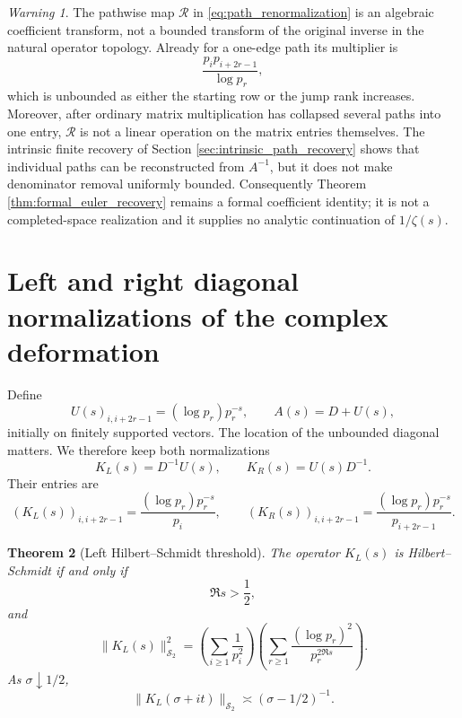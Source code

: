 \documentclass[11pt]{amsart}
\numberwithin{equation}{section}
\theoremstyle{plain}
\newtheorem{theorem}{Theorem}[section]
\theoremstyle{definition}
\theoremstyle{remark}
\newtheorem{warning}[theorem]{Warning}
\newcommand{\HS}{\mathcal S_2}
\begin{document}
\begin{warning}
\label{warn:renormalization_unbounded}
The pathwise map $\mathcal R$ in \eqref{eq:path_renormalization} is an algebraic coefficient transform, not a bounded transform of the original inverse in the natural operator topology.  Already for a one-edge path its multiplier is
\begin{equation}
\frac{p_i p_{i+2r-1}}{\log p_r},
\label{eq:one_edge_renormalization_multiplier}
\end{equation}
which is unbounded as either the starting row or the jump rank increases.  Moreover, after ordinary matrix multiplication has collapsed several paths into one entry, $\mathcal R$ is not a linear operation on the matrix entries themselves.  The intrinsic finite recovery of Section \ref{sec:intrinsic_path_recovery} shows that individual paths can be reconstructed from $A^{-1}$, but it does not make denominator removal uniformly bounded.  Consequently Theorem \ref{thm:formal_euler_recovery} remains a formal coefficient identity; it is not a completed-space realization and it supplies no analytic continuation of $1/\zeta(s)$.
\end{warning}

\section{Left and right diagonal normalizations of the complex deformation}
\label{sec:complex_deformation}

Define
\begin{equation}
U(s)_{i,i+2r-1}=(\log p_r)p_r^{-s},
\qquad
A(s)=D+U(s),
\label{eq:As_definition}
\end{equation}
initially on finitely supported vectors.  The location of the unbounded diagonal matters.  We therefore keep both normalizations
\begin{equation}
K_L(s)=D^{-1}U(s),
\qquad
K_R(s)=U(s)D^{-1}.
\label{eq:left_right_normalizations}
\end{equation}
Their entries are
\begin{equation}
(K_L(s))_{i,i+2r-1}
=\frac{(\log p_r)p_r^{-s}}{p_i},
\qquad
(K_R(s))_{i,i+2r-1}
=\frac{(\log p_r)p_r^{-s}}{p_{i+2r-1}}.
\label{eq:left_right_entries}
\end{equation}

\begin{theorem}[Left Hilbert--Schmidt threshold]
\label{thm:HS_boundary}
The operator $K_L(s)$ is Hilbert--Schmidt if and only if
\begin{equation}
\Re s>\frac12,
\label{eq:HS_half_plane}
\end{equation}
and
\begin{equation}
\|K_L(s)\|_{\HS}^2
=\left(\sum_{i\ge1}\frac1{p_i^2}\right)
\left(\sum_{r\ge1}\frac{(\log p_r)^2}{p_r^{2\Re s}}\right).
\label{eq:HS_factorization}
\end{equation}
As $\sigma\downarrow1/2$,
\begin{equation}
\|K_L(\sigma+it)\|_{\HS}\asymp(\sigma-1/2)^{-1}.
\label{eq:HS_blowup}
\end{equation}
\end{theorem}
\end{document}
